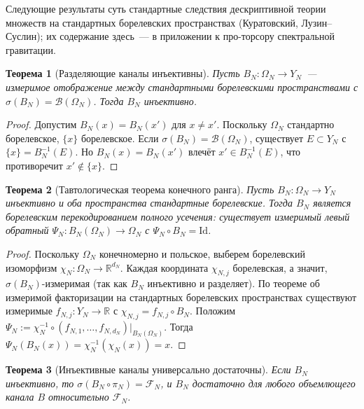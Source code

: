 \documentclass[12pt,a4paper]{article}
\theoremstyle{plain}
\newtheorem{theorem}{Теорема}[section]
\theoremstyle{definition}
\theoremstyle{remark}
\newcommand{\cF}{\mathcal{F}}
\newcommand{\cB}{\mathcal{B}}
\newcommand{\R}{\mathbb{R}}
\newcommand{\Id}{\mathrm{Id}}
\begin{document}
Следующие результаты суть стандартные следствия дескриптивной
теории множеств на стандартных борелевских пространствах
(Куратовский, Лузин--Суслин); их содержание здесь~--- в
приложении к про-торсору спектральной гравитации.

\begin{theorem}[Разделяющие каналы инъективны]
\label{thm:separating-injective}
Пусть $B_N\colon \Omega_N \to Y_N$~--- измеримое отображение
между стандартными борелевскими пространствами с
$\sigma(B_N) = \cB(\Omega_N)$.  Тогда $B_N$ инъективно.
\end{theorem}

\begin{proof}
Допустим $B_N(x) = B_N(x')$ для $x \ne x'$.  Поскольку
$\Omega_N$ стандартно борелевское, $\{x\}$ борелевское.
Если $\sigma(B_N) = \cB(\Omega_N)$, существует
$E \subset Y_N$ с $\{x\} = B_N^{-1}(E)$.  Но
$B_N(x) = B_N(x')$ влечёт $x' \in B_N^{-1}(E)$,
что противоречит $x' \notin \{x\}$.
\end{proof}

\begin{theorem}[Тавтологическая теорема конечного ранга]
\label{thm:tautology}
Пусть $B_N\colon \Omega_N \to Y_N$ инъективно и оба пространства
стандартные борелевские.  Тогда $B_N$ является борелевским
перекодированием полного усечения: существует измеримый левый
обратный $\Psi_N\colon B_N(\Omega_N) \to \Omega_N$ с
$\Psi_N \circ B_N = \Id$.
\end{theorem}

\begin{proof}
Поскольку $\Omega_N$ конечномерно и польское, выберем борелевский
изоморфизм $\chi_N\colon \Omega_N \to \R^{d_N}$.  Каждая координата
$\chi_{N,j}$ борелевская, а значит, $\sigma(B_N)$-измеримая
(так как $B_N$ инъективно и разделяет).  По теореме об измеримой
факторизации на стандартных борелевских пространствах существуют
измеримые $f_{N,j}\colon Y_N \to \R$ с
$\chi_{N,j} = f_{N,j} \circ B_N$.  Положим
$\Psi_N := \chi_N^{-1} \circ (f_{N,1},\ldots,f_{N,d_N})|_{B_N(\Omega_N)}$.
Тогда $\Psi_N(B_N(x)) = \chi_N^{-1}(\chi_N(x)) = x$.
\end{proof}

\begin{theorem}[Инъективные каналы универсально достаточны]
\label{thm:injective-sufficient}
Если $B_N$ инъективно, то $\sigma(B_N\circ\pi_N) = \cF_N$, и
$B_N$ достаточно для любого объемлющего канала $B$ относительно
$\cF_N$.
\end{theorem}
\end{document}
